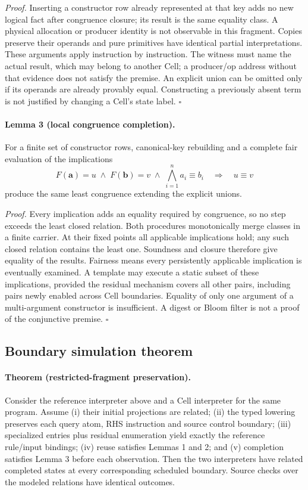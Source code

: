 \emph{Proof.} Inserting a constructor row already represented at that key adds
no new logical fact after congruence closure; its result is the same equality
class. A physical allocation or producer identity is not observable in this
fragment. Copies preserve their operands and pure primitives have identical
partial interpretations. These arguments apply instruction by instruction.
The witness must name the actual result, which may belong to another Cell;
a producer/op address without that evidence does not satisfy the premise.
An explicit union can be omitted only if its operands are already provably
equal. Constructing a previously absent term is not justified by changing a
Cell's state label. $\square$

\paragraph{Lemma 3 (local congruence completion).}
For a finite set of constructor rows, canonical-key rebuilding and a complete
fair evaluation of the implications
\[
 F(\mathbf a)=u\;\land\;F(\mathbf b)=v\;\land\;
 \bigwedge_{i=1}^{n} a_i\equiv b_i\quad\Longrightarrow\quad u\equiv v
\]
produce the same least congruence extending the explicit unions.

\emph{Proof.} Every implication adds an equality required by congruence, so
no step exceeds the least closed relation. Both procedures monotonically merge
classes in a finite carrier. At their fixed points all applicable implications
hold; any such closed relation contains the least one. Soundness and closure
therefore give equality of the results. Fairness means every persistently
applicable implication is eventually examined. A template may execute a static
subset of these implications, provided the residual mechanism covers all other
pairs, including pairs newly enabled across Cell boundaries. Equality of only
one argument of a multi-argument constructor is insufficient. A digest or Bloom
filter is not a proof of the conjunctive premise. $\square$

\subsection{Boundary simulation theorem}
\paragraph{Theorem (restricted-fragment preservation).}
Consider the reference interpreter above and a Cell interpreter for the same
program. Assume (i) their initial projections are related; (ii) the typed lowering
preserves each query atom, RHS instruction and source control boundary;
(iii) specialized entries plus residual enumeration yield exactly the reference
rule/input bindings; (iv) reuse satisfies Lemmas 1 and 2; and (v) completion
satisfies Lemma 3 before each observation. Then the two interpreters have related
completed states at every corresponding scheduled boundary. Source checks over
the modeled relations have identical outcomes.


